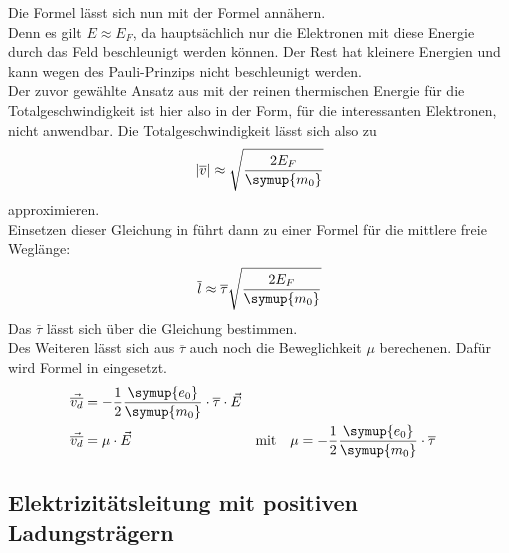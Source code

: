 \noindent
Die Formel  lässt sich nun mit der Formel  annähern.\\
Denn es gilt  $ E\approx E_F$, da hauptsächlich nur die Elektronen mit diese Energie durch das Feld beschleunigt werden können.
Der Rest hat kleinere Energien und kann wegen des Pauli-Prinzips nicht beschleunigt werden.\\
Der zuvor gewählte Ansatz aus  mit der reinen thermischen Energie für die Totalgeschwindigkeit ist hier also in der Form, für die interessanten Elektronen, nicht anwendbar.
Die Totalgeschwindigkeit lässt sich also zu 
\begin{equation}
  |\overline{v}| \approx \sqrt{\frac{2E_F}{\symup{m_0}}} \nonumber
\end{equation}
approximieren.\\
Einsetzen dieser Gleichung in  führt dann zu einer Formel für die mittlere freie Weglänge:
\begin{equation}
  \overline{l} \approx \overline{\tau} \sqrt{\frac{2E_F}{\symup{m_0}}} \nonumber
\end{equation}
Das $\overline{\tau}$ lässt sich über die Gleichung  bestimmen.\\
Des Weiteren lässt sich aus $\overline{\tau}$ auch noch die Beweglichkeit $\mu$ berechenen. Dafür wird Formel  in  eingesetzt.
\begin{align*}
  \vec{\overline{v_d}}&=-\frac{1}{2}\frac{\symup{e_0}}{\symup{m_0}}\cdot   \overline{\tau} \cdot \vec{E}\\
  \vec{\overline{v_d}}&= \mu \cdot \vec{E} & &\text{mit} & \mu&= -\frac{1}{2}\frac{\symup{e_0}}{\symup{m_0}}\cdot   \overline{\tau}\\
\end{align*}




\subsection{Elektrizitätsleitung mit positiven Ladungsträgern}


